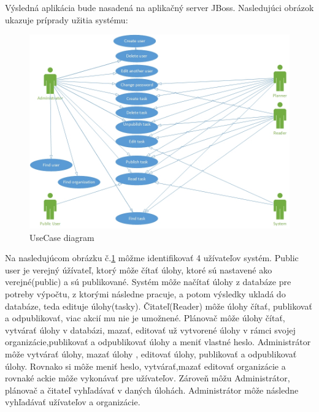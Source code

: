 Výsledná aplikácia bude nasadená na aplikačný server JBoss.
Nasledujúci obrázok ukazuje príprady užitia systému:
\begin{figure}[htb]

\begin{center}

\includegraphics[scale=0.4]{UseCase.jpg} 
\caption{UseCase diagram}
\label{use}

\end{center}

\end{figure}
Na nasledujúcom obrázku č.\ref{use} môžme identifikovať 4 užívateľov systém. Public user je verejný úžívateľ, ktorý môže čítať úlohy, ktoré sú nastavené ako verejné(public) a sú publikované. Systém môže načítať úlohy z databáze pre potreby výpočtu, z ktorými následne pracuje, a potom výsledky ukladá do databáze, teda edituje úlohy(tasky). Čitateľ(Reader) môže úlohy čítať, publikovať a odpublikovať, viac akcií mu nie je umožnené. Plánovač môže úlohy čítať, vytvárať úlohy v databázi, mazať, editovať už vytvorené úlohy v rámci svojej organizácie,publikovať a odpublikovať úlohy a meniť vlastné heslo. Administrátor môže vytvárať úlohy, mazať úlohy , editovať úlohy, publikovať a odpublikovať úlohy. Rovnako si môže meniť heslo, vytvárať,mazať editovať organizácie a rovnaké ackie môže vykonávať pre užívateľov. Zároveň môžu Administrátor, plánovač a čitateľ vyhľadávať v daných úlohách. Administrátor môže následne vyhľadávať užívateľov a organizácie.


